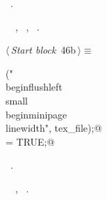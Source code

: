 \documentclass[a4paper]{report}
\begin{document}
\begin{flushleft}
\begin{minipage}{\linewidth}
\begin{list}{}{}
\mbox{}\verb@    }@\\
\mbox{}\verb@  }@\\
\mbox{}\verb@  fprintf(tex_file, "\\label{scrap%d}\\raggedright\\small\n", scraps);@\\
\mbox{}\verb@}@{\NWsep}
\end{list}
\vspace{-1.5ex}
\footnotesize
\begin{list}{}{\setlength{\itemsep}{-\parsep}\setlength{\itemindent}{-\leftmargin}}
\item \NWtxtMacroRefIn\ .
\item \NWtxtIdentsUsed\nobreak\  \verb@fprintf@\nobreak\ , \verb@fputs@\nobreak\ , \verb@scraps@\nobreak\ .
\item{}
\end{list}
\end{minipage}\vspace{4ex}
\end{flushleft}
\begin{flushleft} \small
\begin{minipage}{\linewidth}\label{scrap85}\raggedright\small
{} $\langle\,${\it Start block}\nobreak\ {\footnotesize {46b}}$\,\rangle\equiv$
\vspace{-1ex}
\begin{list}{}{} \item
\mbox{}\verb@fputs("\\begin{flushleft} \\small\n\\begin{minipage}{\\linewidth}", tex_file);@\\
\mbox{}\verb@inBlock = TRUE;@{\NWsep}
\end{list}
\vspace{-1.5ex}
\footnotesize
\begin{list}{}{\setlength{\itemsep}{-\parsep}\setlength{\itemindent}{-\leftmargin}}
\item \NWtxtMacroRefIn\ .
\item \NWtxtIdentsUsed\nobreak\  \verb@fputs@\nobreak\ , \verb@TRUE@\nobreak\ .
\item{}
\end{list}
\end{minipage}\vspace{4ex}
\end{flushleft}
\end{document}
